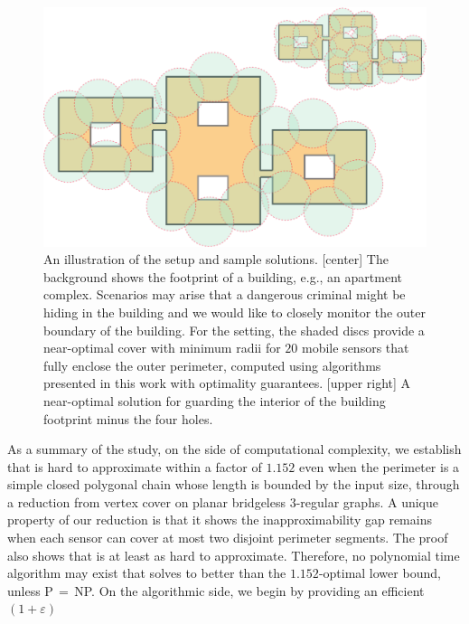 \begin{figure}[ht]
    \centering
		\vspace*{2mm}
    \includegraphics[width=\columnwidth]{chapters/osg/figures/example-0-eps-converted-to.pdf}
		\vspace*{1mm}
    \caption[An illustration of the \osgt setup and sample solutions]
		{An illustration of the \osgt setup and sample solutions.
		[center] The background shows the footprint of a building, e.g., an 
		apartment complex. Scenarios may arise that a dangerous criminal 
		might be hiding in the building and we would like to closely monitor 
		the outer boundary of the building.	For the setting, the shaded 
		discs provide a	near-optimal cover with minimum radii for $20$ 
		mobile sensors that fully enclose the outer perimeter, computed 
		using algorithms presented in this work with optimality guarantees. 
		[upper right] A near-optimal solution for guarding the interior of
		the building footprint minus the four holes.}
    \label{fig:example0}
\end{figure}
As a summary of the study, on the side of computational complexity, we 
establish that \opgt is hard to approximate within a factor of 
$1.152$
even when the perimeter is a simple closed polygonal chain whose length
is bounded by the input size, through a reduction from 
vertex cover on planar bridgeless $3$-regular graphs.
%
A unique property of our reduction is that it shows the inapproximability gap
remains when each sensor can cover at most two disjoint perimeter 
segments. 
%
The proof also shows that \orgt is at least as hard to approximate. 
Therefore, no polynomial time algorithm may exist that solves \osgt to 
better than the $1.152$-optimal lower bound, unless P$\,=\,$NP. 
%
On the algorithmic side, we begin by providing an efficient $(1+\varepsilon)$
